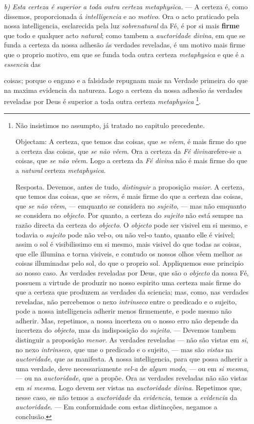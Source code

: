 \emph{b) Esta certeza é superior a toda outra certeza metaphysica.} --- A certeza é, como dissemos, proporcionada á \emph{intelligencia} e   ao \emph{motivo}. Ora o acto praticado pela nossa intelligencia, esclarecida pela luz \emph{sobrenatural} da Fé, é por si mais \textbf{firme} que todo e qualquer acto \emph{natural}; como tambem a \emph{auctoridade divina}, em que se funda a certeza da nossa adhesão ás verdades reveladas, é um motivo mais firme que o proprio motivo, em que   se funda toda outra certeza \emph{metaphysica} e que é a \emph{essencia} das

coisas; porque o engano e a falsidade repugnam mais na Verdade primeira do que na maxima evidencia da natureza. Logo a certeza da nossa adhesão ás verdades reveladas por Deus é superior a toda outra certeza \emph{metaphysica} \footnote{Não insistimos no assumpto, já tratado no capitulo precedente.\par Objectam: A certeza, que temos das coisas, que \emph{se vêem}, é mais firme do que a certeza das coisas, que \emph{se não vêem}. Ora a certeza da \emph{Fé divina}refere-se a coisas, que \emph{se não vêem}. Logo a certeza da \emph{Fé divina} não é mais firme do que a \emph{natural} certeza \emph{metaphysica}.\par Resposta. Devemos, antes de tudo, \emph{distinguir} a proposição \emph{maior}. A certeza, que temos das coisas, que \emph{se vêem}, é mais firme do que a certeza das coisas, que \emph{se não vêem}, --- emquanto se considera no \emph{sujeito}, --- mas não emquanto se considera no \emph{objecto}. Por quanto, a certeza do \emph{sujeito} não está sempre na razão directa da certeza do \emph{objecto}. O \emph{objecto} pode ser visivel em si mesmo, e todavia o \emph{sujeito} pode não vel-o, ou não vel-o tanto, quanto elle é visivel; assim o sol é visibilissimo em si mesmo, mais visivel do que todas as coisas, que elle illumina e torna visiveis, e comtudo os nossos olhos vêem melhor as coisas illuminadas pelo sol, do que o proprio sol. Appliquemos esse principio ao nosso caso. As verdades reveladas por Deus, que são o \emph{objecto} da nossa Fé, possuem a virtude de produzir no nosso espirito uma certeza mais firme do que a certeza que produzem as verdades da sciencia; mas, como, nas verdades reveladas, não percebemos o nexo \emph{intrinseco} entre o predicado e o sujeito, pode a nossa intelligencia adherir menos firmemente, e pode mesmo não adherir. Mas, repetimos, a nossa incerteza ou o nosso erro não depende da incerteza do \emph{objecto}, mas da indisposição do \emph{sujeito}. --- Devemos tambem distinguir a proposição \emph{menor}. As verdades reveladas --- não são vistas em \emph{si}, no nexo \emph{intrinseco}, que une o predicado e o sujeito, --- mas são \emph{vistas} na \emph{auctoridade}, que as manifesta. A nossa intelligencia, para que possa adherir a uma verdade, deve necessariamente \emph{vel-a} de \emph{algum modo}, --- ou em \emph{si mesma}, --- ou na \emph{auctoridade}, que a propõe. Ora as verdades reveladas não são vistas em \emph{si mesma}. Logo devem ser vistas na \emph{auctoridade divina}. Repetimos que, nesse caso, se não temos a \emph{auctoridade} da \emph{evidencia}, temos a \emph{evidencia} da \emph{auctoridade}. --- Em conformidade com estas distincções, negamos a conclusão.}.

